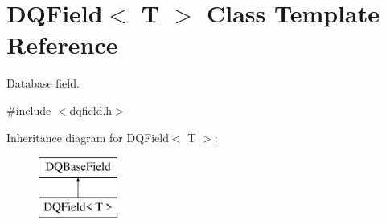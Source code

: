 \hypertarget{classDQField}{
\section{DQField$<$ T $>$ Class Template Reference}
\label{classDQField}
}


Database field.  




{\ttfamily \#include $<$dqfield.h$>$}

Inheritance diagram for DQField$<$ T $>$:\begin{figure}[H]
\begin{center}
\leavevmode
\includegraphics[height=2.000000cm]{classDQField}
\end{center}
\end{figure}
